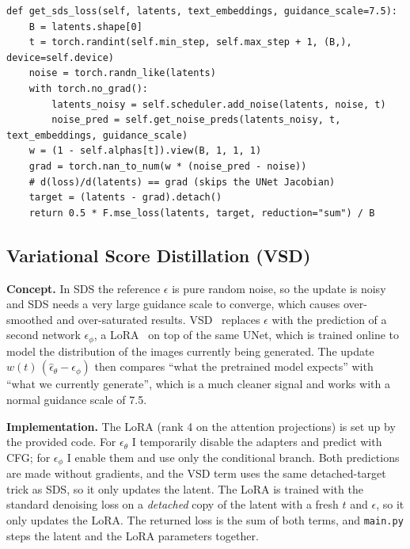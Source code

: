 \begin{lstlisting}
def get_sds_loss(self, latents, text_embeddings, guidance_scale=7.5):
    B = latents.shape[0]
    t = torch.randint(self.min_step, self.max_step + 1, (B,), device=self.device)
    noise = torch.randn_like(latents)
    with torch.no_grad():
        latents_noisy = self.scheduler.add_noise(latents, noise, t)
        noise_pred = self.get_noise_preds(latents_noisy, t, text_embeddings, guidance_scale)
    w = (1 - self.alphas[t]).view(B, 1, 1, 1)
    grad = torch.nan_to_num(w * (noise_pred - noise))
    # d(loss)/d(latents) == grad (skips the UNet Jacobian)
    target = (latents - grad).detach()
    return 0.5 * F.mse_loss(latents, target, reduction="sum") / B
\end{lstlisting}

\subsection{Variational Score Distillation (VSD)}
\label{sec:vsd}

\noindent\textbf{Concept.}
In SDS the reference $\epsilon$ is pure random noise, so the update is noisy and SDS needs a very large guidance scale to converge, which causes over-smoothed and over-saturated results.
VSD~\cite{wang2023prolificdreamer} replaces $\epsilon$ with the prediction of a second network $\epsilon_\phi$, a LoRA~\cite{hu2022lora} on top of the same UNet, which is trained online to model the distribution of the images currently being generated.
The update $w(t)\,(\hat\epsilon_\theta - \epsilon_\phi)$ then compares ``what the pretrained model expects'' with ``what we currently generate'', which is a much cleaner signal and works with a normal guidance scale of 7.5.

\noindent\textbf{Implementation.}
The LoRA (rank 4 on the attention projections) is set up by the provided code.
For $\epsilon_\theta$ I temporarily disable the adapters and predict with CFG; for $\epsilon_\phi$ I enable them and use only the conditional branch.
Both predictions are made without gradients, and the VSD term uses the same detached-target trick as SDS, so it only updates the latent.
The LoRA is trained with the standard denoising loss on a \emph{detached} copy of the latent with a fresh $t$ and $\epsilon$, so it only updates the LoRA.
The returned loss is the sum of both terms, and \texttt{main.py} steps the latent and the LoRA parameters together.

